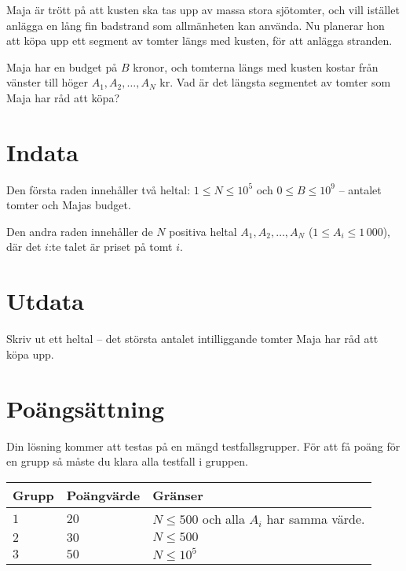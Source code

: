 Maja är trött på att kusten ska tas upp av massa stora sjötomter, och vill istället anlägga en lång fin badstrand som allmänheten kan använda.
Nu planerar hon att köpa upp ett segment av tomter längs med kusten, för att anlägga stranden.

Maja har en budget på $B$ kronor, och tomterna längs med kusten kostar från vänster till höger $A_1,A_2,\dots,A_N$ kr.
Vad är det längsta segmentet av tomter som Maja har råd att köpa?

\section*{Indata}
Den första raden innehåller två heltal: $1\leq N \leq 10^5$ och $0 \leq B \leq 10^9$ -- antalet tomter och Majas budget.

Den andra raden innehåller de $N$ positiva heltal $A_1,A_2, \dots, A_N$ ($1 \le A_i \le 1\,000$), där det $i$:te talet är priset på tomt $i$.


\section*{Utdata}
Skriv ut ett heltal -- det största antalet intilliggande tomter Maja har råd att köpa upp.

\section*{Poängsättning}
Din lösning kommer att testas på en mängd testfallsgrupper.
För att få poäng för en grupp så måste du klara alla testfall i gruppen.

\noindent
\begin{tabular}{| l | l | p{12cm} |}
  \hline
  Grupp & Poängvärde & Gränser \\ \hline
  $1$   & $20$       & $N \leq 500 $ och alla $A_i$ har samma värde.\\ \hline
  $2$   & $30$       & $N \leq 500 $\\ \hline
  $3$   & $50$       & $N \leq 10^5 $  \\ \hline
\end{tabular}
